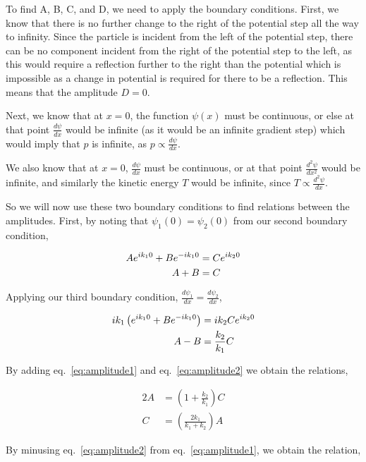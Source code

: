 \documentclass[11pt]{amsart}
\begin{document}
To find A, B, C, and D, we need to apply the boundary conditions. First, we know that there is no further change to the right of the potential step all the way to infinity. Since the particle is incident from the left of the potential step, there can be no component incident from the right of the potential step to the left, as this would require a reflection further to the right than the potential which is impossible as a change in potential is required for there to be a reflection. This
means that the amplitude $D = 0$.

Next, we know that at $x = 0$, the function $\psi(x)$ must be continuous, or else at that point $\frac{d\psi}{dx}$ would be infinite (as it would be an infinite gradient step) which would imply that $p$ is infinite, as $p \propto \frac{d\psi}{dx}$.

We also know that at $x = 0$, $\frac{d\psi}{dx}$ must be continuous, or at that point $\frac{d^2 \psi}{dx^2}$ would be infinite, and similarly the kinetic energy $T$ would be infinite, since $T \propto \frac{d^2 \psi}{dx}$.

So we will now use these two boundary conditions to find relations between the amplitudes. First, by noting that $\psi_1(0) = \psi_2(0)$ from our second boundary condition,

\begin{align}
  \label{eq:amplitude1}
  A e^{i k_1 0} + B e^{-i k_1 0} &= C e^{i k_2 0} \notag\\
  A + B &= C
\end{align}

Applying our third boundary condition, $\frac{d\psi_1}{dx} = \frac{d\psi_2}{dx}$,

\begin{align}
  \label{eq:amplitude2}
  i k_1 \left(e^{i k_1 0} + B e^{-i k_1 0}\right) &= i k_2 C e^{i k_2 0} \notag\\
  A - B &= \frac{k_2}{k_1} C
\end{align}

By adding eq.~\ref{eq:amplitude1} and eq.~\ref{eq:amplitude2} we obtain the relations,

\begin{align*}
  2A &= \left(1 + \frac{k_2}{k_1}\right) C \\
  C &= \left(\frac{2 k_1}{k_1 + k_2}\right) A
\end{align*}

By minusing eq.~\ref{eq:amplitude2} from eq.~\ref{eq:amplitude1}, we obtain the relation,
\end{document}
